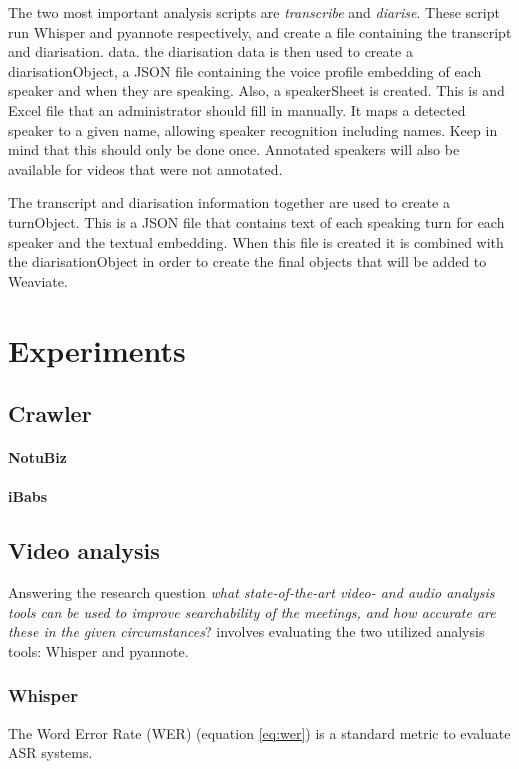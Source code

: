 \documentclass[twoside]{uva-inf-bachelor-thesis}
\begin{document}
The two most important analysis scripts are \textit{transcribe} and \textit{diarise}. These script run Whisper and pyannote respectively, and create a file containing the transcript and diarisation. data. the diarisation data is then used to create a diarisationObject, a JSON file containing the voice profile embedding of each speaker and when they are speaking. Also, a speakerSheet is created. This is and Excel file that an administrator should fill in manually. It maps a detected speaker to a given name, allowing speaker recognition including names. Keep in mind that this should only be done once. Annotated speakers will also be available for videos that were not annotated.

The transcript and diarisation information together are used to create a turnObject. This is a JSON file that contains text of each speaking turn for each speaker and the textual embedding. When this file is created it is combined with the diarisationObject in order to create the final objects that will be added to Weaviate.


\chapter{Experiments}
\section{Crawler}
\subsubsection{NotuBiz}

\subsubsection{iBabs}


\section{Video analysis}
Answering the research question \textit{what state-of-the-art video- and audio analysis tools can be used to improve searchability of the meetings, and how accurate are these in the given circumstances}? involves evaluating the two utilized analysis tools: Whisper and pyannote.
\subsection{Whisper}
The Word Error Rate (WER) (equation \ref{eq:wer}) is a standard metric to evaluate ASR systems. 
\end{document}
